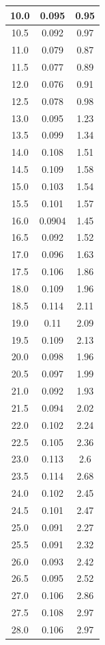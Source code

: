 \documentclass[a4paper,14pt]{article}
\begin{document}
\begin{longtable}{|c|c|c|}
10.0 & 0.095 & 0.95 \\ \hline
10.5 & 0.092 & 0.97 \\ \hline
11.0 & 0.079 & 0.87 \\ \hline
11.5 & 0.077 & 0.89 \\ \hline
12.0 & 0.076 & 0.91 \\ \hline
12.5 & 0.078 & 0.98 \\ \hline
13.0 & 0.095 & 1.23 \\ \hline
13.5 & 0.099 & 1.34 \\ \hline
14.0 & 0.108 & 1.51 \\ \hline
14.5 & 0.109 & 1.58 \\ \hline
15.0 & 0.103 & 1.54 \\ \hline
15.5 & 0.101 & 1.57 \\ \hline
16.0 & 0.0904 & 1.45 \\ \hline
16.5 & 0.092 & 1.52 \\ \hline
17.0 & 0.096 & 1.63 \\ \hline
17.5 & 0.106 & 1.86 \\ \hline
18.0 & 0.109 & 1.96 \\ \hline
18.5 & 0.114 & 2.11 \\ \hline
19.0 & 0.11 & 2.09 \\ \hline
19.5 & 0.109 & 2.13 \\ \hline
20.0 & 0.098 & 1.96 \\ \hline
20.5 & 0.097 & 1.99 \\ \hline
21.0 & 0.092 & 1.93 \\ \hline
21.5 & 0.094 & 2.02 \\ \hline
22.0 & 0.102 & 2.24 \\ \hline
22.5 & 0.105 & 2.36 \\ \hline
23.0 & 0.113 & 2.6 \\ \hline
23.5 & 0.114 & 2.68 \\ \hline
24.0 & 0.102 & 2.45 \\ \hline
24.5 & 0.101 & 2.47 \\ \hline
25.0 & 0.091 & 2.27 \\ \hline
25.5 & 0.091 & 2.32 \\ \hline
26.0 & 0.093 & 2.42 \\ \hline
26.5 & 0.095 & 2.52 \\ \hline
27.0 & 0.106 & 2.86 \\ \hline
27.5 & 0.108 & 2.97 \\ \hline
28.0 & 0.106 & 2.97 \\ \hline

\end{longtable}
\end{document}
